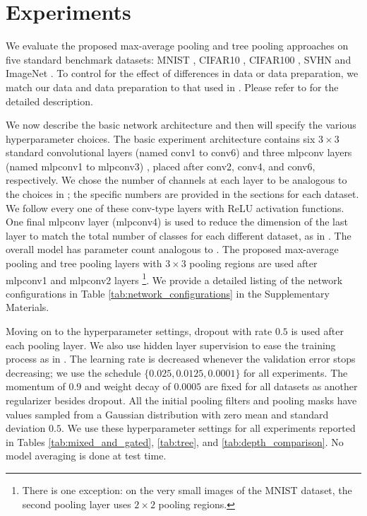 \documentclass[twoside]{article}
\begin{document}
\section{Experiments} \label{sec:exp}
\vspace{-4mm}
We evaluate the proposed max-average pooling and tree pooling approaches on five 
standard benchmark datasets: MNIST \cite{lecun1998mnist}, CIFAR10 \cite{krizhevsky2009learning}, 
CIFAR100 \cite{krizhevsky2009learning}, SVHN \cite{netzer2011reading} and ImageNet \cite{russakovsky2014imagenet}. 
To control for the effect of differences in data or data preparation, we match our data and data preparation to that 
used in \cite{lee2015deeply}. Please refer to \cite{lee2015deeply} for the detailed description.
 
We now describe the basic network architecture and then will specify the various hyperparameter 
choices. The basic experiment architecture contains six  $3\times3$  standard convolutional layers (named conv1 to conv6) and three 
mlpconv layers (named mlpconv1 to mlpconv3) \cite{lin2013network}, placed after 
conv2, conv4, and conv6, respectively. We chose the number of channels at each layer
to be analogous to the choices in \cite{lin2013network,lee2015deeply}; the specific numbers 
are provided in the sections for each dataset. We follow every one of these conv-type 
layers with ReLU activation functions. One final mlpconv layer  (mlpconv4) is used 
to reduce the dimension of the last layer to match the total number of classes for 
each different dataset, as in \cite{lin2013network}. The overall model has parameter 
count analogous to \cite{lin2013network,lee2015deeply}. The proposed max-average pooling 
and tree pooling layers with $3\times3$ pooling 
regions are used after mlpconv1 and mlpconv2 layers \footnote{There is one exception: 
on the very small images of the MNIST dataset, the second pooling layer uses $2\times2$ pooling regions.}. 
We provide a detailed listing of the network configurations in Table \ref{tab:network_configurations} 
in the Supplementary Materials. 

Moving on to the hyperparameter settings, dropout with rate $0.5$ is used after each 
pooling layer. We also use hidden layer supervision to ease the training process as 
in \cite{lee2015deeply}. The learning rate is decreased whenever the validation error 
stops decreasing; we use the schedule $\{0.025,0.0125,0.0001\}$ for all experiments. 
The momentum of $0.9$ and weight decay of $0.0005$ are fixed for all datasets as 
another regularizer besides dropout. All the initial pooling filters and pooling masks 
have values sampled from a Gaussian distribution with zero mean and standard deviation 
$0.5$. We use these hyperparameter settings for all experiments reported in Tables \ref{tab:mixed_and_gated}, 
\ref{tab:tree}, and \ref{tab:depth_comparison}. 
No model averaging is done at test time. 
\end{document}
